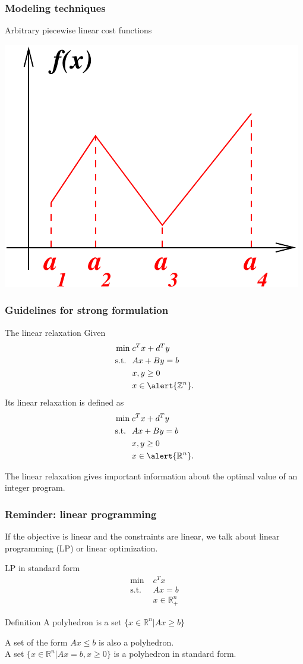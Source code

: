 \documentclass[9pt]{beamer}
\newcommand{\Z}       {\mathbb{Z} }
\newcommand{\R}       {\mathbb{R} }
\newcommand{\st}{\mathrm{s.t.}}
\begin{document}
\begin{frame}
\frametitle{Modeling techniques}
\begin{block}{Arbitrary piecewise linear cost functions}
\begin{center}
\includegraphics[width=.4\linewidth]{piecewise.pdf}
\end{center}
\end{block}
\end{frame}
\begin{frame}
\frametitle{Guidelines for strong formulation}
\begin{block}{The linear relaxation}
Given
\begin{align*}
\min\;& c^Tx+d^Ty\\
\text{s.t. }\;& Ax+By=b\\
&x,y\geq 0\\
&x\in\alert{\Z^n}.
\end{align*}
Its  \alert{linear relaxation} is defined as 
\begin{align*}
\min\;& c^Tx+d^Ty\\
\text{s.t. }\;& Ax+By=b\\
&x,y\geq 0\\
&x\in\alert{\R^n}.
\end{align*}
\end{block}
The linear relaxation gives important information about
the optimal value of an integer program.
\end{frame}
\begin{frame}
\frametitle{Reminder: linear programming}
If the objective is \alert{linear} and the constraints are \alert{linear},
we talk about \alert{linear programming} (LP) or \alert{linear optimization}.
\begin{block}{LP in standard form}
\begin{align*}
\min\; & c^T x\\
\st \;& Ax=b\\
& x\in \R^n_+
\end{align*}
\end{block}
\begin{block}{Definition}
A \alert{polyhedron} is a set $\{x\in \R^n|Ax\geq b\}$
\end{block}
A set of the      form  $Ax\leq b$ is also a polyhedron.\\
A set $\{x\in \R^n| Ax=b, x\geq 0\}$ is a polyhedron in \alert{standard form}.
\end{frame}
\end{document}
